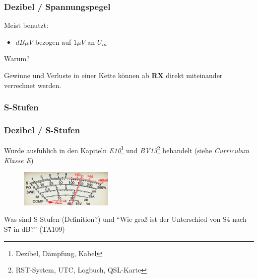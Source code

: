 \begin{frame}
  \frametitle{Dezibel / Spannungspegel}

  Meist benutzt:

  \begin{itemize}
    \item $dB \mu V$ bezogen auf $1 \mu V$ an $U_{in}$
  \end{itemize}

  \begin{center}
    Warum?
  \end{center}

  \pause

  Gewinne und Verluste in einer Kette können ab \textbf{RX} direkt miteinander
  verrechnet werden.

\end{frame}

\subsubsection{S-Stufen}

\begin{frame}
  \frametitle{Dezibel / S-Stufen}

  Wurde ausfühlich in den Kapiteln \emph{E10}\footnote{Dezibel, Dämpfung,
  Kabel} und \emph{BV13}\footnote{RST-System, UTC, Logbuch, QSL-Karte}
  behandelt (siehe \emph{Curriculum Klasse E}\hyperlink{refs}{\cite{curr}})

  \begin{center}
    \begin{figure}
      \includegraphics[width=0.4\textwidth,height=0.2\textheight,keepaspectratio]{e10/S-Meter.jpg}
    \end{figure}
  \end{center}


  \begin{exampleblock}{Was sind S-Stufen (Definition?) und ``Wie groß ist der
    Unterschied von S4 nach S7 in dB?'' (TA109)}
  \end{exampleblock}

\end{frame}

